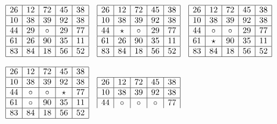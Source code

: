 \begin{figure}
\begin{footnotesize}
\begin{math}
\begin{array}{ccc}
\begin{array}{|c|c|c|c|c|}
\hline
26 & 12 & 72 & 45 & 38 \\
\hline
10 & 38 & 39 & 92 & 38 \\
\hline
44 & 29 & \circ & 29 & 77 \\
\hline
61 & 26 & 90 & 35 & 11 \\
\hline
83 & 84 & 18 & 56 & 52 \\
\hline
\end{array}
&
\begin{array}{|c|c|c|c|c|}
\hline
26 & 12 & 72 & 45 & 38 \\
\hline
10 & 38 & 39 & 92 & 38 \\
\hline
44 & \star & \circ & 29 & 77 \\
\hline
61 & 26 & 90 & 35 & 11 \\
\hline
83 & 84 & 18 & 56 & 52 \\
\hline
\end{array}
&
\begin{array}{|c|c|c|c|c|}
\hline
26 & 12 & 72 & 45 & 38 \\
\hline
10 & 38 & 39 & 92 & 38 \\
\hline
44 & \circ & \circ & 29 & 77 \\
\hline
61 & \star & 90 & 35 & 11 \\
\hline
83 & 84 & 18 & 56 & 52 \\
\hline
\end{array}
\\
 & & \\
\begin{array}{|c|c|c|c|c|}
\hline
26 & 12 & 72 & 45 & 38 \\
\hline
10 & 38 & 39 & 92 & 38 \\
\hline
44 & \circ & \circ & \star & 77 \\
\hline
61 & \circ & 90 & 35 & 11 \\
\hline
83 & 84 & 18 & 56 & 52 \\
\hline
\end{array}
&
\begin{array}{|c|c|c|c|c|}
\hline
26 & 12 & 72 & 45 & 38 \\
\hline
10 & 38 & 39 & 92 & 38 \\
\hline
44 & \circ & \circ & \circ & 77 \\

\end{array}
\end{array}
\end{math}
\end{footnotesize}
\end{figure}
